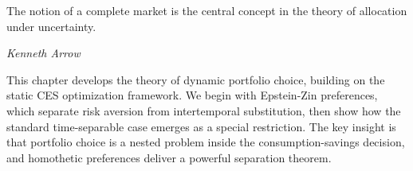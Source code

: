 \epigraph{The notion of a complete market is the central concept in the theory of allocation under uncertainty.}{\textit{Kenneth Arrow}}


This chapter develops the theory of dynamic portfolio choice, building on the static CES optimization framework. We begin with Epstein-Zin preferences, which separate risk aversion from intertemporal substitution, then show how the standard time-separable case emerges as a special restriction. The key insight is that portfolio choice is a nested problem inside the consumption-savings decision, and homothetic preferences deliver a powerful separation theorem.










% 
% 
% 